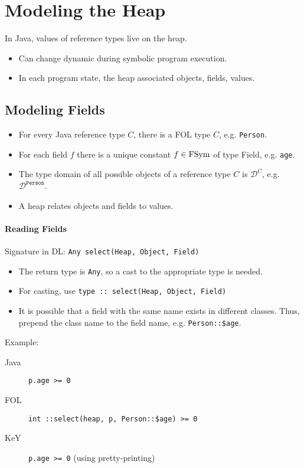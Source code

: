 \section{Modeling the Heap}
	In Java, values of reference types live on the heap.
	\begin{itemize}
		\item Can change dynamic during symbolic program execution.
		\item In each program state, the heap associated objects, fields, values.
	\end{itemize}

	\subsection{Modeling Fields}
		\begin{itemize}
			\item For every Java reference type \(C\), there is a FOL type \(C\), e.g. \texttt{Person}.
			\item For each field \(f\) there is a unique constant \( f \in \operatorname{FSym} \) of type Field, e.g. \texttt{age}.
			\item The type domain of all possible objects of a reference type \(C\) is \( \mathcal{D}^C \), e.g. \( \mathcal{D}^\texttt{Person} \).
			\item A heap relates objects and fields to values.
		\end{itemize}

		\paragraph{Reading Fields}
			Signature in DL: \texttt{Any select(Heap, Object, Field)}
			\begin{itemize}
				\item The return type is \texttt{Any}, so a cast to the appropriate type is needed.
				\item For casting, use \texttt{type :: select(Heap, Object, Field)}
				\item It is possible that a field with the same name exists in different classes. Thus, prepend the class name to the field name, e.g. \texttt{Person::\$age}.
			\end{itemize}

			Example:
			\begin{description}
				\item[Java] \texttt{p.age >= 0}
				\item[FOL]  \texttt{int ::select(heap, p, Person::\$age) >= 0}
				\item[KeY]  \texttt{p.age >= 0} (using pretty-printing)
			\end{description}

